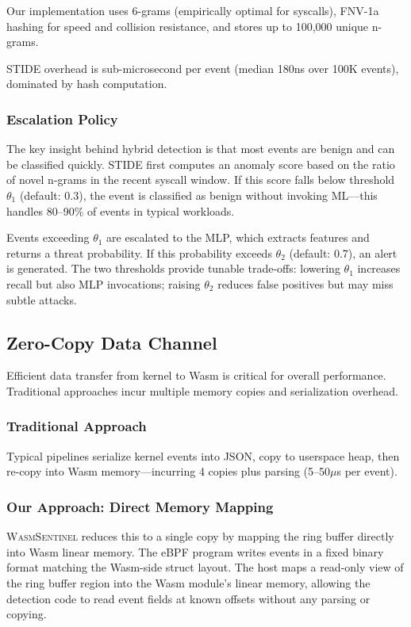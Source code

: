 Our implementation uses 6-grams (empirically optimal for syscalls), FNV-1a hashing for speed and collision resistance, and stores up to 100,000 unique n-grams.

STIDE overhead is sub-microsecond per event (median 180ns over 100K events), dominated by hash computation.

\subsubsection{Escalation Policy}

The key insight behind hybrid detection is that most events are benign and can be classified quickly.
STIDE first computes an anomaly score based on the ratio of novel n-grams in the recent syscall window.
If this score falls below threshold $\theta_1$ (default: 0.3), the event is classified as benign without invoking ML---this handles 80--90\% of events in typical workloads.

Events exceeding $\theta_1$ are escalated to the MLP, which extracts features and returns a threat probability.
If this probability exceeds $\theta_2$ (default: 0.7), an alert is generated.
The two thresholds provide tunable trade-offs: lowering $\theta_1$ increases recall but also MLP invocations; raising $\theta_2$ reduces false positives but may miss subtle attacks.

\subsection{Zero-Copy Data Channel}
\label{sec:design-zerocopy}

Efficient data transfer from kernel to Wasm is critical for overall performance.
Traditional approaches incur multiple memory copies and serialization overhead.

\subsubsection{Traditional Approach}

Typical pipelines serialize kernel events into JSON, copy to userspace heap, then re-copy into Wasm memory---incurring 4 copies plus parsing (5--50$\mu$s per event).

\subsubsection{Our Approach: Direct Memory Mapping}

\textsc{WasmSentinel} reduces this to a single copy by mapping the ring buffer directly into Wasm linear memory.
The eBPF program writes events in a fixed binary format matching the Wasm-side struct layout.
The host maps a read-only view of the ring buffer region into the Wasm module's linear memory, allowing the detection code to read event fields at known offsets without any parsing or copying.

